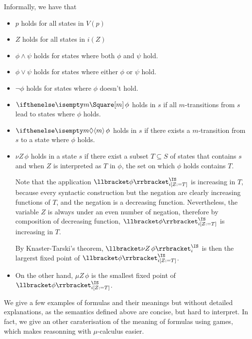 Informally, we have that
\begin{itemize}
    \item $p$ holds for all states in $V(p)$
    \item $Z$ holds for all states in $i(Z)$
    \item $\phi \wedge \psi$ holds for states where both $\phi$ and $\psi$ hold.
    \item $\phi \vee \psi$ holds for states where either $\phi$ or $\psi$ hold.
    \item $\neg \phi$ holds for states where $\phi$ doesn't hold.
    \item $\boite m \phi$ holds in $s$ if all $m$-transitions from $s$ lead to states where $\phi$ holds.
    \item $\diam m \phi$ holds in $s$ if there exists a $m$-transition from $s$ to a state where $\phi$ holds.
    \item $\nu Z \, \phi$ holds in a state $s$
        if there exist a subset $T \subseteq S$ of states
        that contains $s$ and when $Z$ is interpreted as $T$
        in $\phi$, the set on which $\phi$ holds contains $T$.

        Note that the application
        $\Meaning{\phi}^\IS_{i[Z := T]}$ is increasing in $T$,
        because every syntactic construction but the negation are clearly
        increasing functions of $T$, and the negation is a decreasing
        function. Nevertheless, the variable $Z$ is always under an even number of
        negation, therefore by composition of decreasing function,
        $\Meaning{\phi}^\IS_{i[Z := T]}$ is increasing in $T$.

        By Knaster-Tarski's theorem, $\Meaning{\nu Z\, \phi}^\IS_i$
        is then the largerst fixed point of $\Meaning{\phi}^\IS_{i[Z := T]}$.
    \item On the other hand, $\mu Z \, \phi$ is the smallest fixed point
        of $\Meaning{\phi}^\IS_{i[Z := T]}$.
\end{itemize}

We give a few examples of formulas and their meanings but without detailed
explanations, as the semantics defined above are concise, but hard to interpret.
In fact, we give an other caraterisation of the meaning of formulas using games,
which makes reasonning with $\mu$-calculus easier.

